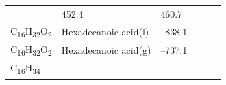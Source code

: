 \documentclass[
  9pt,
]{extbook}
\theoremstyle{definition}
\theoremstyle{definition}
\theoremstyle{definition}
\theoremstyle{remark}
\begin{document}
\begin{longtable}[]{@{}llllll@{}}
\begin{minipage}[t]{0.15\columnwidth}
\strut
\end{minipage} & \begin{minipage}[t]{0.14\columnwidth}\raggedright
452.4\strut
\end{minipage} & \begin{minipage}[t]{0.14\columnwidth}\raggedright
460.7\strut
\end{minipage}\tabularnewline
\begin{minipage}[t]{0.07\columnwidth}\raggedright
C\textsubscript{16}H\textsubscript{32}O\textsubscript{2}\strut
\end{minipage} & \begin{minipage}[t]{0.17\columnwidth}\raggedright
Hexadecanoic acid(l)\strut
\end{minipage} & \begin{minipage}[t]{0.15\columnwidth}\raggedright
--838.1\strut
\end{minipage} & \begin{minipage}[t]{0.15\columnwidth}\raggedright
\strut
\end{minipage} & \begin{minipage}[t]{0.14\columnwidth}\raggedright
\strut
\end{minipage} & \begin{minipage}[t]{0.14\columnwidth}\raggedright
\strut
\end{minipage}\tabularnewline
\begin{minipage}[t]{0.07\columnwidth}\raggedright
C\textsubscript{16}H\textsubscript{32}O\textsubscript{2}\strut
\end{minipage} & \begin{minipage}[t]{0.17\columnwidth}\raggedright
Hexadecanoic acid(g)\strut
\end{minipage} & \begin{minipage}[t]{0.15\columnwidth}\raggedright
--737.1\strut
\end{minipage} & \begin{minipage}[t]{0.15\columnwidth}\raggedright
\strut
\end{minipage} & \begin{minipage}[t]{0.14\columnwidth}\raggedright
\strut
\end{minipage} & \begin{minipage}[t]{0.14\columnwidth}\raggedright
\strut
\end{minipage}\tabularnewline
\begin{minipage}[t]{0.07\columnwidth}\raggedright
C\textsubscript{16}H\textsubscript{34}\strut
\end{minipage} & \begin{minipage}[t]{0.17\columnwidth}\raggedright

\end{minipage}
\end{longtable}
\end{document}
